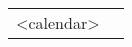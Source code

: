 {\noindent\renewcommand{\arraystretch}{0}%
\begin{tabularx}{\textwidth}{@{}l X@{}}
<calendar> &
\Repeat{\myNumQuarterlyLines}{\myLineGrayVskipBottom}
\end{tabularx}}